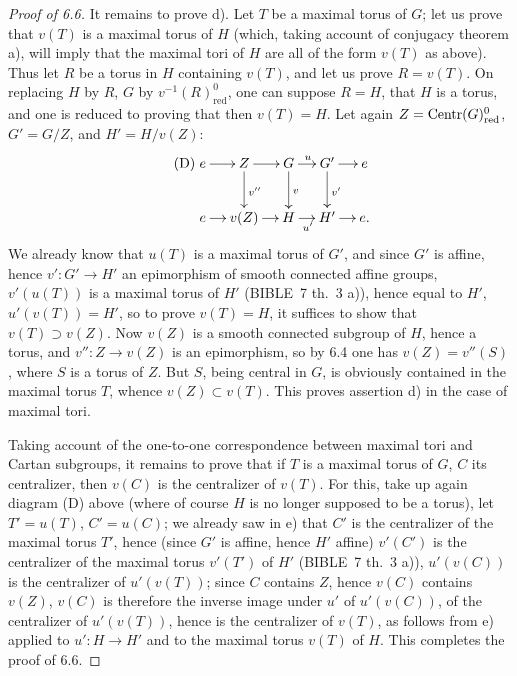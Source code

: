 \begin{proof}[Proof of 6.6]
It remains to prove d). Let $T$ be a maximal torus of $G$; let us prove that $v(T)$ is a maximal torus of $H$ (which, taking account of conjugacy theorem a), will imply that the maximal tori of $H$ are all of the form $v(T)$ as above). Thus let $R$ be a torus in $H$ containing $v(T)$, and let us prove $R=v(T)$. On replacing $H$ by $R$, $G$ by $v^{-1}(R)^0_{\mathrm{red}}$, one can suppose $R=H$, \ie that $H$ is a torus, and one is reduced to proving that then $v(T)=H$. Let again $Z=\operatorname{Centr}(G)^0_{\mathrm{red}}$, $G'=G/Z$, and $H'=H/v(Z)$:
\begin{equation}\tag{D}
\xymatrix@C=1.1em{e\ar[r]&Z\ar[r]\ar[d]^{v''}&G\ar[r]^u\ar[d]^v&G'\ar[r]\ar[d]^{v'}&e\\e\ar[r]&v(Z)\ar[r]&H\ar[r]_{u'}&H'\ar[r]&e.}
\end{equation}
We already know that $u(T)$ is a maximal torus of $G'$, and since $G'$ is affine, hence $v':G'\to H'$ an epimorphism of smooth connected affine groups, $v'(u(T))$ is a maximal torus of $H'$ (BIBLE~7 th.~3 a)), hence equal to $H'$, \ie $u'(v(T))=H'$, so to prove $v(T)=H$, it suffices to show that $v(T)\supset v(Z)$. Now $v(Z)$ is a smooth connected subgroup of $H$, hence a torus, and $v'':Z\to v(Z)$ is an epimorphism, so by 6.4 one has $v(Z)=v''(S)$, where $S$ is a torus of $Z$. But $S$, being central in $G$, is obviously contained in the maximal torus $T$, whence $v(Z)\subset v(T)$. This proves assertion d) in the case of maximal tori.

Taking account of the one-to-one correspondence between maximal tori and Cartan subgroups, it remains to prove that if $T$ is a maximal torus of $G$, $C$ its centralizer, then $v(C)$ is the centralizer of $v(T)$. For this, take up again diagram (D) above (where of course $H$ is no longer supposed to be a torus), let $T'=u(T)$, $C'=u(C)$; we already saw in e) that $C'$ is the centralizer of the maximal torus $T'$, hence (since $G'$ is affine, hence $H'$ affine) $v'(C')$ is the centralizer of the maximal torus $v'(T')$ of $H'$ (BIBLE~7 th.~3 a)), \ie $u'(v(C))$ is the centralizer of $u'(v(T))$; since $C$ contains $Z$, hence $v(C)$ contains $v(Z)$, $v(C)$ is therefore the inverse image under $u'$ of $u'(v(C))$, \ie of the centralizer of $u'(v(T))$, hence is the centralizer of $v(T)$, as follows from e) applied to $u':H\to H'$ and to the maximal torus $v(T)$ of $H$. This completes the proof of 6.6.
\end{proof}

